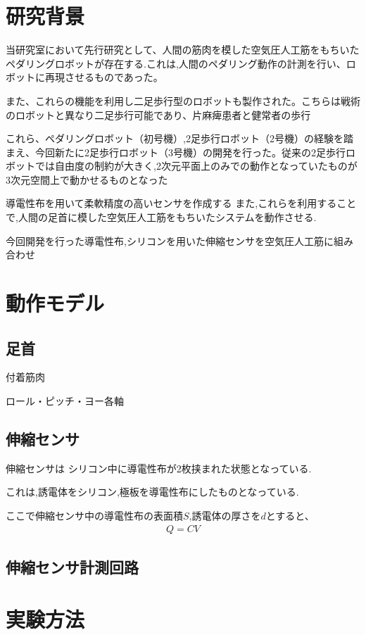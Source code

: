 \section{研究背景}
当研究室において先行研究として、人間の筋肉を模した空気圧人工筋をもちいたペダリングロボットが存在する.これは,人間のペダリング動作の計測を行い、ロボットに再現させるものであった。


また、これらの機能を利用し二足歩行型のロボットも製作された。こちらは戦術のロボットと異なり二足歩行可能であり、片麻痺患者と健常者の歩行

これら、ペダリングロボット（初号機）,2足歩行ロボット（2号機）の経験を踏まえ、今回新たに2足歩行ロボット（3号機）の開発を行った。従来の2足歩行ロボットでは自由度の制約が大きく,2次元平面上のみでの動作となっていたものが3次元空間上で動かせるものとなった

導電性布を用いて柔軟精度の高いセンサを作成する
また,これらを利用することで,人間の足首に模した空気圧人工筋をもちいたシステムを動作させる.

今回開発を行った導電性布,シリコンを用いた伸縮センサを空気圧人工筋に組み合わせ
\section{動作モデル}
\subsection{足首}
付着筋肉

ロール・ピッチ・ヨー各軸
\subsection{伸縮センサ}
伸縮センサは
シリコン中に導電性布が2枚挟まれた状態となっている.

これは,誘電体をシリコン,極板を導電性布にしたものとなっている.

ここで伸縮センサ中の導電性布の表面積$S$,誘電体の厚さを$d$とすると、
\begin{eqnarray}
    Q=CV
\end{eqnarray}
\subsection{伸縮センサ計測回路}
\section{実験方法}
